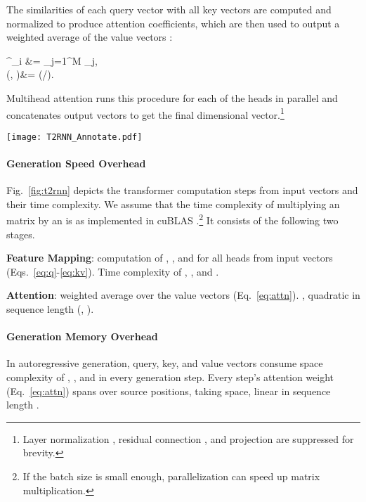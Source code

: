 \documentclass[11pt]{article}
\def\similarity{\mathrm{sim}}
\def\vk{{\mathbf{k}}}
\def\vq{{\mathbf{q}}}
\def\vv{{\mathbf{v}}}
\def\vx{{\mathbf{x}}}
\def\vy{{\mathbf{y}}}
\newcommand{\out}{{\mathrm{out}}}
\newcommand{\TRNN}{T2R\xspace}
\begin{document}
The similarities of each query vector  with all  key vectors are computed and normalized to produce attention coefficients, which are then used to output a weighted average of the value vectors \cite{Vaswani2017AttentionIA}:

\vx^{\out}_i  &=  \sum_{j=1}^M \frac{\similarity\left(\vq_i, \vk_j\right)}{\sum_{\ell=1}^M \similarity\left(\vq_i, \vk_{\ell}\right)} \vv_j,\label{eq:attn}\\
\similarity (\vx, \vy)&=
\exp\left(\vx \cdot \vy/\right).\label{eq:dot_exp}

Multihead attention runs this procedure for each of the  heads in parallel and concatenates  output vectors to get the final  dimensional vector.\footnote{Layer normalization \cite{Ba2016LayerN}, residual connection \cite{resnet}, and projection are suppressed for brevity.}  
\begin{figure*}[t]
\centering
    \texttt{[image: T2RNN\_Annotate.pdf]}
\caption{Attention computation steps and their time complexity in pretrained transformer and \TRNN models during inference generation. 
Features   and  are directly computed from input vectors,
and  and  are never constructed.
: source length; : target length; : model dimensions; : feature size; : \# heads.
}
\label{fig:t2rnn}
\end{figure*}


\paragraph{Generation Speed Overhead}
Fig.\ \ref{fig:t2rnn} depicts the transformer computation steps from input vectors and their time complexity.
We assume that the time complexity of multiplying an  matrix by an  is  as implemented in cuBLAS \cite{cublas}.\footnote{If the batch size is small enough, parallelization can speed up matrix multiplication.}
It consists of the following two stages.
\begin{compactitem}
\item \textbf{Feature Mapping}: computation of ,  , and  for all  heads from input vectors (Eqs.\ \ref{eq:q}-\ref{eq:kv}).
Time complexity of , , and .
\item \textbf{Attention}: weighted average over the value vectors (Eq.\ \ref{eq:attn}). , quadratic in sequence length (, ).
\end{compactitem}
\paragraph{Generation Memory Overhead}
In autoregressive generation, 
query, key, and value vectors consume space complexity of , , and  in every generation step.
Every step's attention weight (Eq.~\ref{eq:attn}) spans over  source positions, taking  space, linear in sequence length .
\end{document}
